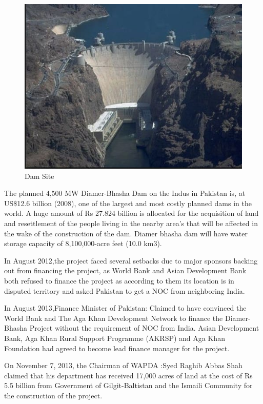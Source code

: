 \documentclass[11pt, journal,letterpaper,compsoc]{IEEEtran}
\begin{document}
\begin{figure} 
\includegraphics[width=\linewidth]{images/dam}
\caption{Dam Site}
\label{fig:dam}
\end{figure}


The planned 4,500 MW Diamer-Bhasha Dam on the Indus in Pakistan is, at US\$12.6 billion (2008), one of the largest and most costly planned dams in the world. A huge amount of Rs 27.824 billion is allocated for the acquisition of land and resettlement of the people living in the nearby area’s that will be affected in the wake of the construction of the dam. Diamer bhasha dam will have water storage capacity of 8,100,000-acre feet (10.0 km3). 



In August 2012,the project faced several setbacks due to major sponsors backing out from financing the project, as World Bank and Asian Development Bank both refused to finance the project as according to them its location is in disputed territory and asked Pakistan to get
 a NOC from neighboring India.
\hfill  

In August 2013,Finance Minister of Pakistan: Claimed to have convinced the World Bank and The Aga Khan Development Network to finance the Diamer-Bhasha Project without the requirement of NOC from India. Asian Development Bank, Aga Khan Rural Support Programme
 (AKRSP) and Aga Khan Foundation had agreed to become lead finance manager for the project.
\hfill  

On November 7, 2013, the Chairman of WAPDA :Syed Raghib Abbas Shah claimed that his department has received 17,000 acres of land at the cost of Rs 5.5 billion from Government of Gilgit-Baltistan and the Ismaili Community for the construction of the project.
\hfill 
 
\end{document}
